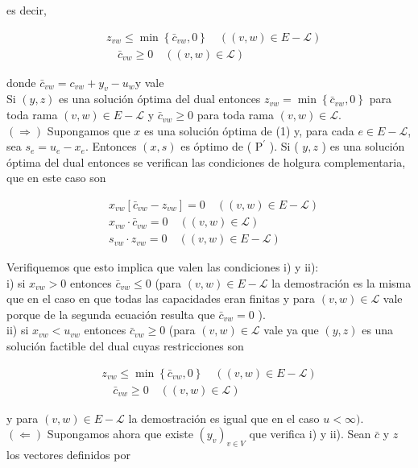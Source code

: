 \documentclass[10pt]{article}
\begin{document}
es decir,

$$
\begin{aligned}
& z_{v w} \leq \min \left\{\bar{c}_{v w}, 0\right\} \quad((v, w) \in E-\mathcal{L}) \\
& \quad \bar{c}_{v w} \geq 0 \quad((v, w) \in \mathcal{L})
\end{aligned}
$$

donde $\bar{c}_{v w}=c_{v w}+y_{v}-u_{w} \mathrm{y}$ vale\\
Si $(y, z)$ es una solución óptima del dual entonces $z_{v w}=\min \left\{\bar{c}_{v w}, 0\right\}$ para toda rama $(v, w) \in E-\mathcal{L}$ y $\bar{c}_{v w} \geq 0$ para toda rama $(v, w) \in \mathcal{L}$.\\
$(\Longrightarrow)$ Supongamos que $x$ es una solución óptima de (1) y, para cada $e \in E-\mathcal{L}$, sea $s_{e}=u_{e}-x_{e}$. Entonces $(x, s)$ es óptimo de ( $\mathrm{P}^{\prime}$ ). Si ( $y, z$ ) es una solución óptima del dual entonces se verifican las condiciones de holgura complementaria, que en este caso son

$$
\begin{aligned}
& x_{v w}\left[\bar{c}_{v w}-z_{v w}\right]=0 \quad((v, w) \in E-\mathcal{L}) \\
& x_{v w} \cdot \bar{c}_{v w}=0 \quad((v, w) \in \mathcal{L}) \\
& s_{v w} \cdot z_{v w}=0 \quad((v, w) \in E-\mathcal{L})
\end{aligned}
$$

Verifiquemos que esto implica que valen las condiciones i) y ii):\\
i) si $x_{v w}>0$ entonces $\bar{c}_{v w} \leq 0$ (para $(v, w) \in E-\mathcal{L}$ la demostración es la misma que en el caso en que todas las capacidades eran finitas y para $(v, w) \in \mathcal{L}$ vale porque de la segunda ecuación resulta que $\bar{c}_{v w}=0$ ).\\
ii) si $x_{v w}<u_{v w}$ entonces $\bar{c}_{v w} \geq 0$ (para $(v, w) \in \mathcal{L}$ vale ya que $(y, z)$ es una solución factible del dual cuyas restricciones son

$$
\begin{gathered}
z_{v w} \leq \min \left\{\bar{c}_{v w}, 0\right\} \quad((v, w) \in E-\mathcal{L}) \\
\quad \bar{c}_{v w} \geq 0 \quad((v, w) \in \mathcal{L})
\end{gathered}
$$

y para $(v, w) \in E-\mathcal{L}$ la demostración es igual que en el caso $u<\infty)$.\\
$(\Longleftarrow)$ Supongamos ahora que existe $\left(y_{v}\right)_{v \in V}$ que verifica i) y ii). Sean $\bar{c}$ y $z$ los vectores definidos por
\end{document}
